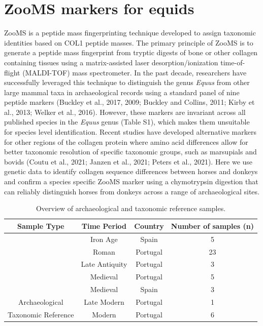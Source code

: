 \documentclass[preprint, 3p, authoryear]{elsarticle} %
\begin{document}
\hypertarget{zooms-markers-for-equids}{%
\section{ZooMS markers for equids}\label{zooms-markers-for-equids}}

ZooMS is a peptide mass fingerprinting technique developed to assign taxonomic identities based on COL1 peptide masses. The primary principle of ZooMS is to generate a peptide mass fingerprint from tryptic digests of bone or other collagen containing tissues using a matrix-assisted laser desorption/ionization time-of-flight (MALDI-TOF) mass spectrometer. In the past decade, researchers have successfully leveraged this technique to distinguish the genus \emph{Equus} from other large mammal taxa in archaeological records using a standard panel of nine peptide markers (Buckley et al., 2017, 2009; Buckley and Collins, 2011; Kirby et al., 2013; Welker et al., 2016). However, these markers are invariant across all published species in the \emph{Equus} genus (Table S1), which makes them unsuitable for species level identification. Recent studies have developed alternative markers for other regions of the collagen protein where amino acid differences allow for better taxonomic resolution of specific taxonomic groups, such as marsupials and bovids (Coutu et al., 2021; Janzen et al., 2021; Peters et al., 2021). Here we use genetic data to identify collagen sequence differences between horses and donkeys and confirm a species specific ZooMS marker using a chymotrypsin digestion that can reliably distinguish horses from donkeys across a range of archaeological sites.

\begin{table}[H]

\caption{\label{tab:eqtable1}Overview of archaeological and taxonomic reference samples.}
\centering
\begin{tabular}[t]{cccc}
\toprule
Sample Type & Time Period & Country & Number of samples (n)\\
\midrule
 & Iron Age & Spain & 5\\
\cmidrule{2-4}
 & Roman & Portugal & 23\\
\cmidrule{2-4}
 & Late Antiquity & Portugal & 3\\
\cmidrule{2-4}
 & Medieval & Portugal & 5\\
\cmidrule{2-4}
 & Medieval & Spain & 3\\
\cmidrule{2-4}
\multirow{-6}{*}{\centering\arraybackslash Archaeological} & Late Modern & Portugal & 1\\
\cmidrule{1-4}
Taxonomic Reference & Modern & Portugal & 6\\
\bottomrule
\end{tabular}
\end{table}
\end{document}
